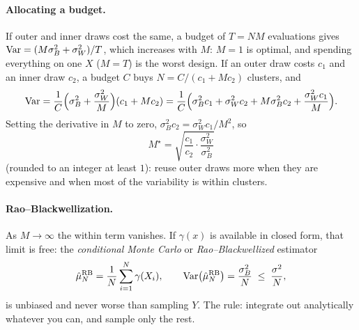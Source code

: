 \begin{notechapter}
\paragraph{Allocating a budget.} If outer and inner draws cost the same, a budget of
$T = NM$ evaluations gives $\operatorname{Var} = (M\sigma_B^2 + \sigma_W^2)/T$, which increases with
$M$: $M = 1$ is optimal, and spending everything on one $X$ ($M = T$) is the worst
design. If an outer draw costs $c_1$ and an inner draw $c_2$, a budget $C$ buys
$N = C/(c_1 + Mc_2)$ clusters, and
\[
  \operatorname{Var} = \frac1C\Bigl(\sigma_B^2 + \frac{\sigma_W^2}M\Bigr)(c_1 + Mc_2)
  = \frac1C\Bigl(\sigma_B^2c_1 + \sigma_W^2c_2 + M\sigma_B^2c_2 + \frac{\sigma_W^2c_1}M\Bigr).
\]
Setting the derivative in $M$ to zero, $\sigma_B^2c_2 = \sigma_W^2c_1/M^2$, so
\[
  \boxed{\;M^\star = \sqrt{\frac{c_1}{c_2}\cdot\frac{\sigma_W^2}{\sigma_B^2}}\;}
\]
(rounded to an integer at least $1$): reuse outer draws more when they are expensive
and when most of the variability is within clusters.

\paragraph{Rao--Blackwellization.} As $M\to\infty$ the within term vanishes. If
$\gamma(x)$ is available in closed form, that limit is free: the \emph{conditional
Monte Carlo} or \emph{Rao--Blackwellized} estimator
\[
  \hat\mu_N^{\mathrm{RB}} = \frac1N\sum_{i=1}^N\gamma(X_i),\qquad
  \operatorname{Var}\bigl(\hat\mu_N^{\mathrm{RB}}\bigr) = \frac{\sigma_B^2}N\;\leq\;\frac{\sigma^2}N,
\]
is unbiased and never worse than sampling $Y$. The rule: integrate out analytically
whatever you can, and sample only the rest.


\end{notechapter}
